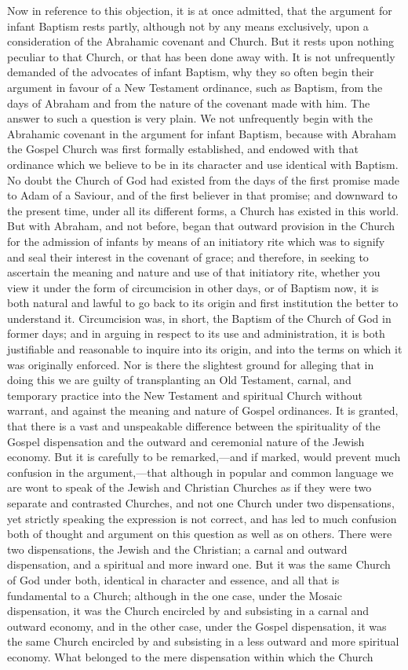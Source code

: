 \documentclass[]{book}
\begin{document}
Now in reference to this objection, it is at once admitted, that the argument for infant Baptism rests partly, although not by any means exclusively, upon a consideration of the Abrahamic covenant and Church. But it rests upon nothing peculiar to that Church, or that has been done away with. It is not unfrequently demanded of the advocates of infant Baptism, why they so often begin their argument in favour of a New Testament ordinance, such as Baptism, from the days of Abraham and from the nature of the covenant made with him. The answer to such a question is very plain. We not unfrequently begin with the Abrahamic covenant in the argument for infant Baptism, because with Abraham the Gospel Church was first formally established, and endowed with that ordinance which we believe to be in its character and use identical with Baptism. No doubt the Church of God had existed from the days of the first promise made to Adam of a Saviour, and of the first believer in that promise; and downward to the present time, under all its different forms, a Church has existed in this world. But with Abraham, and not before, began that outward provision in the Church for the admission of infants by means of an initiatory rite which was to signify and seal their interest in the covenant of grace; and therefore, in seeking to ascertain the meaning and nature and use of that initiatory rite, whether you view it under the form of circumcision in other days, or of Baptism now, it is both natural and lawful to go back to its origin and first institution the better to understand it. Circumcision was, in short, the Baptism of the Church of God in former days; and in arguing in respect to its use and administration, it is both justifiable and reasonable to inquire into its origin, and into the terms on which it was originally enforced. Nor is there the slightest ground for alleging that in doing this we are guilty of transplanting an Old Testament, carnal, and temporary practice into the New Testament and spiritual Church without warrant, and against the meaning and nature of Gospel ordinances. It is granted, that there is a vast and unspeakable difference between the spirituality of the Gospel dispensation and the outward and ceremonial nature of the Jewish economy. But it is carefully to be remarked,---and if marked, would prevent much confusion in the argument,---that although in popular and common language we are wont to speak of the Jewish and Christian Churches as if they were two separate and contrasted Churches, and not one Church under two dispensations, yet strictly speaking the expression is not correct, and has led to much confusion both of thought and argument on this question as well as on others. There were two dispensations, the Jewish and the Christian; a carnal and outward dispensation, and a spiritual and more inward one. But it was the same Church of God under both, identical in character and essence, and all that is fundamental to a Church; although in the one case, under the Mosaic dispensation, it was the Church encircled by and subsisting in a carnal and outward economy, and in the other case, under the Gospel dispensation, it was the same Church encircled by and subsisting in a less outward and more spiritual economy. What belonged to the mere dispensation within which the Church 
\end{document}
